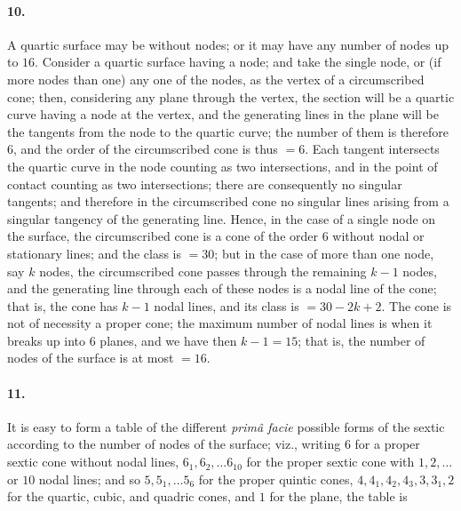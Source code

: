 \documentclass[11pt,a4paper]{article}
\begin{document}
\paragraph{10.}
A quartic surface may be without nodes; or it may have any number of nodes up to $16$.
Consider a quartic surface having a node; and take the single node, or (if more nodes than
one) any one of the nodes, as the vertex of a circumscribed cone; then, considering any
plane through the vertex, the section will be a quartic curve having a node at the vertex,
and the generating lines in the plane will be the tangents from the node to the quartic
curve; the number of them is therefore $6$, and the order of the circumscribed cone is
thus $= 6$. Each tangent intersects the quartic curve in the node counting as two
intersections, and in the point of contact counting as two intersections; there are
consequently no singular tangents; and therefore in the circumscribed cone no singular
lines arising from a singular tangency of the generating line. Hence, in the case of a
single node on the surface, the circumscribed cone is a cone of the order $6$ without nodal
or stationary lines; and the class is $= 30$; but in the case of more than one node, say
$k$ nodes, the circumscribed cone passes through the remaining $k - 1$ nodes, and the
generating line through each of these nodes is a nodal line of the cone; that is, the cone
has $k - 1$ nodal lines, and its class is $= 30 - 2 k + 2$. The cone is not of necessity a
proper cone; the maximum number of nodal lines is when it breaks up into $6$ planes, and we
have then $k - 1 = 15$; that is, the number of nodes of the surface is at most $= 16$.

\paragraph{11.}
It is easy to form a table of the different \textit{prim\^a facie} possible forms of the
sextic according to the number of nodes of the surface; viz., writing $6$ for a proper
sextic cone without nodal lines, $6_1, 6_2, \ldots 6_{10}$ for the proper sextic cone with
$1, 2, \ldots$ or $10$ nodal lines; and so $5, 5_1, \ldots 5_6$ for the proper quintic
cones, $4, 4_1, 4_2, 4_3, 3, 3_1, 2$ for the quartic, cubic, and quadric cones, and $1$ for
the plane, the table is
\end{document}
